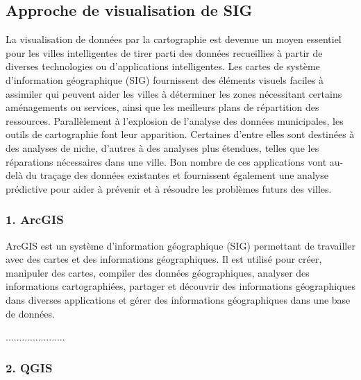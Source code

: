 \documentclass[french, a4paper, 12pt]{report}
\begin{document}
\subsection{Approche de visualisation de SIG}
La visualisation de données par la cartographie est devenue un moyen essentiel pour les villes intelligentes de tirer parti des données recueillies à partir de diverses technologies ou d’applications intelligentes. Les cartes de système d'information géographique (SIG) fournissent des éléments visuels faciles à assimiler qui peuvent aider les villes à déterminer les zones nécessitant certains aménagements ou services, ainsi que les meilleurs plans de répartition des ressources.
Parallèlement à l'explosion de l'analyse des données municipales, les outils de cartographie font leur apparition. Certaines d'entre elles sont destinées à des analyses de niche, d'autres à des analyses plus étendues, telles que les réparations nécessaires dans une ville. Bon nombre de ces applications vont au-delà du traçage des données existantes et fournissent également une analyse prédictive pour aider à prévenir et à résoudre les problèmes futurs des villes.
\subsubsection{1. ArcGIS}

ArcGIS est un système d'information géographique (SIG) permettant de travailler avec des cartes et des informations géographiques. Il est utilisé pour créer, manipuler des cartes, compiler des données géographiques, analyser des informations cartographiées, partager et découvrir des informations géographiques dans diverses applications et gérer des informations géographiques dans une base de données.

......................






\subsubsection{2. QGIS}
\end{document}
